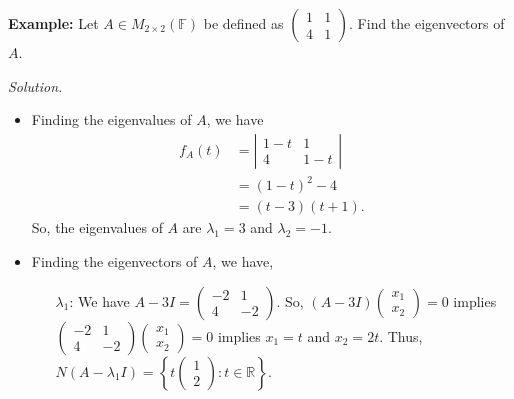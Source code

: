 \documentclass[12pt]{article}
\begin{document}
\noindent\textbf{Example:} Let $A \in M_{2 \times 2}(\mathbb{F})$ be defined as $\begin{pmatrix}
1 & 1 \\ 4 & 1
\end{pmatrix}$. Find the eigenvectors of $A$.

\textit{Solution.}
\begin{itemize}
    \item Finding the eigenvalues of $A$, we have \begin{align*}
        f_A(t) &= \left|\begin{array}{cc}
           1-t  & 1 \\
            4 & 1-t
        \end{array}
        \right| \\
        &= (1-t)^2 - 4 \\
        &= (t-3)(t+1).
    \end{align*}
    So, the eigenvalues of $A$ are $\lambda_1 = 3$ and $\lambda_2 = -1$.
    
    
    \item Finding the eigenvectors of $A$, we have,
        \begin{itemize}
        \item[$\lambda_1$:] We have $A - 3I = \begin{pmatrix}
        -2 & 1 \\ 4 & -2
        \end{pmatrix}$. So, $(A - 3I)\begin{pmatrix}
        x_1 \\ x_2
        \end{pmatrix} = 0$ implies $\begin{pmatrix}
        -2 & 1 \\ 4 & -2
        \end{pmatrix}\begin{pmatrix}
        x_1 \\ x_2
        \end{pmatrix} = 0$ implies $x_1 = t$ and $x_2 = 2t$. Thus, $N(A - \lambda_1 I) = \left\{ t \begin{pmatrix}
        1 \\ 2
        \end{pmatrix} : t \in \mathbb{R} \right\}$. 
        

\end{itemize}
\end{itemize}
\end{document}
